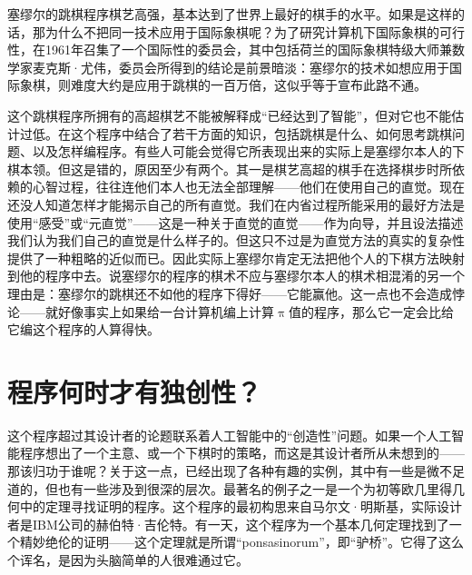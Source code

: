 塞缪尔的跳棋程序棋艺高强，基本达到了世界上最好的棋手的水平。如果是这样的话，那为什么不把同一技术应用于国际象棋呢？为了研究计算机下国际象棋的可行性，在1961年召集了一个国际性的委员会，其中包括荷兰的国际象棋特级大师兼数学家麦克斯·尤伟，委员会所得到的结论是前景暗淡：塞缪尔的技术如想应用于国际象棋，则难度大约是应用于跳棋的一百万倍，这似乎等于宣布此路不通。

这个跳棋程序所拥有的高超棋艺不能被解释成“已经达到了智能”，但对它也不能估计过低。在这个程序中结合了若干方面的知识，包括跳棋是什么、如何思考跳棋问题、以及怎样编程序。有些人可能会觉得它所表现出来的实际上是塞缪尔本人的下棋本领。但这是错的，原因至少有两个。其一是棋艺高超的棋手在选择棋步时所依赖的心智过程，往往连他们本人也无法全部理解——他们在使用自己的直觉。现在还没人知道怎样才能揭示自己的所有直觉。我们在内省过程所能采用的最好方法是使用“感受”或“元直觉”——这是一种关于直觉的直觉——作为向导，并且设法描述我们认为我们自己的直觉是什么样子的。但这只不过是为直觉方法的真实的复杂性提供了一种粗略的近似而已。因此实际上塞缪尔肯定无法把他个人的下棋方法映射到他的程序中去。说塞缪尔的程序的棋术不应与塞缪尔本人的棋术相混淆的另一个理由是：塞缪尔的跳棋还不如他的程序下得好——它能赢他。这一点也不会造成悖论——就好像事实上如果给一台计算机编上计算$\uppi$值的程序，那么它一定会比给它编这个程序的人算得快。

\section{程序何时才有独创性？}

这个程序超过其设计者的论题联系着人工智能中的“创造性”问题。如果一个人工智能程序想出了一个主意、或一个下棋时的策略，而这是其设计者所从未想到的——那该归功于谁呢？关于这一点，已经出现了各种有趣的实例，其中有一些是微不足道的，但也有一些涉及到很深的层次。最著名的例子之一是一个为初等欧几里得几何中的定理寻找证明的程序。这个程序的最初构思来自马尔文·明斯基，实际设计者是IBM公司的赫伯特·吉伦特。有一天，这个程序为一个基本几何定理找到了一个精妙绝伦的证明——这个定理就是所谓“ponsasinorum”，即“驴桥”。它得了这么个诨名，是因为头脑简单的人很难通过它。

\begin{lrbox}{\TEMPBOX}%
\end{lrbox}

\begin{figure}
\end{figure}

